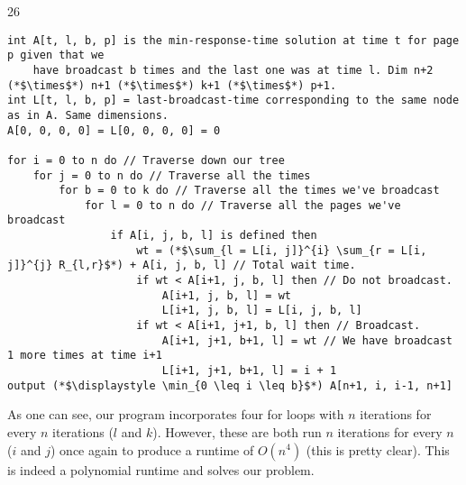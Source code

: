 \documentclass{article}
\begin{document}
\begin{prob} {26}
	\pagebreak
	\begin{lstlisting}
int A[t, l, b, p] is the min-response-time solution at time t for page p given that we
    have broadcast b times and the last one was at time l. Dim n+2 (*$\times$*) n+1 (*$\times$*) k+1 (*$\times$*) p+1.
int L[t, l, b, p] = last-broadcast-time corresponding to the same node as in A. Same dimensions.
A[0, 0, 0, 0] = L[0, 0, 0, 0] = 0

for i = 0 to n do // Traverse down our tree
    for j = 0 to n do // Traverse all the times
        for b = 0 to k do // Traverse all the times we've broadcast
            for l = 0 to n do // Traverse all the pages we've broadcast
                if A[i, j, b, l] is defined then
                    wt = (*$\sum_{l = L[i, j]}^{i} \sum_{r = L[i, j]}^{j} R_{l,r}$*) + A[i, j, b, l] // Total wait time.
                    if wt < A[i+1, j, b, l] then // Do not broadcast.
                        A[i+1, j, b, l] = wt
                        L[i+1, j, b, l] = L[i, j, b, l]
                    if wt < A[i+1, j+1, b, l] then // Broadcast.
                        A[i+1, j+1, b+1, l] = wt // We have broadcast 1 more times at time i+1
                        L[i+1, j+1, b+1, l] = i + 1
output (*$\displaystyle \min_{0 \leq i \leq b}$*) A[n+1, i, i-1, n+1]
	\end{lstlisting}

	As one can see, our program incorporates four for loops with $n$ iterations for every $n$ iterations ($l$ and $k$).  However, these are both run $n$ iterations for every $n$ ($i$ and $j$) once again to produce a runtime of $O(n^4)$ (this is pretty clear).  This is indeed a polynomial runtime and solves our problem.
  
\end{prob}
\end{document}
